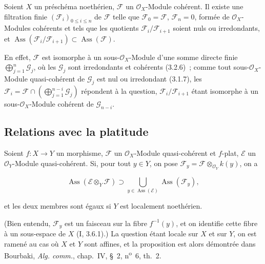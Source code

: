 \begin{corollary}[3.2.8]
\label{IV.2.3.2.8-fr}
Soient $X$ un préschéma noethérien, $\mathcal F$ un $\mathcal O_X$-Module
cohérent. Il existe une filtration finie $(\mathcal F_i)_{0\le i\le n}$ de
$\mathcal F$ telle que $\mathcal F_0=\mathcal F$, $\mathcal F_n=0$, formée de
$\mathcal O_X$-Modules cohérents et tels que les quotients
$\mathcal F_i/\mathcal F_{i+1}$ soient nuls ou irredondants, et
$\operatorname{Ass}(\mathcal F_i/\mathcal F_{i+1})
\subset\operatorname{Ass}(\mathcal F)$.
\end{corollary}

En effet, $\mathcal F$ est isomorphe à un sous-$\mathcal O_X$-Module d'une
somme directe finie $\bigoplus_{j=1}^n\mathcal G_j$, où les $\mathcal G_j$
sont irredondants et cohérents (3.2.6)~; comme tout sous-$\mathcal O_X$-Module
quasi-cohérent de $\mathcal G_j$ est nul ou irredondant (3.1.7), les
$\mathcal F_i=\mathcal F\cap(\bigoplus_{j=1}^{n-i}\mathcal G_j)$ répondent à
la question, $\mathcal F_i/\mathcal F_{i+1}$ étant isomorphe à un
sous-$\mathcal O_X$-Module cohérent de $\mathcal G_{n-i}$.

\subsection{Relations avec la platitude}

\begin{proposition}[3.3.1]
\label{IV.2.3.3.1-fr}
Soient $f:X\to Y$ un morphisme, $\mathcal F$ un $\mathcal O_X$-Module
quasi-cohérent et $f$-plat, $\mathcal E$ un $\mathcal O_Y$-Module
quasi-cohérent. Si, pour tout $y\in Y$, on pose
$\mathcal F_y=\mathcal F\otimes_{\mathcal O_Y}k(y)$, on a
\end{proposition}

\begin{env}[3.3.1.1]
\label{IV.2.3.3.1.1-fr}
\[
\operatorname{Ass}(\mathcal E\otimes_Y\mathcal F)
\supset\bigcup_{y\in\operatorname{Ass}(\mathcal E)}
\operatorname{Ass}(\mathcal F_y),
\]
\end{env}

et les deux membres sont égaux si $Y$ est localement noethérien.

(Bien entendu, $\mathcal F_y$ est un faisceau sur la fibre $f^{-1}(y)$, et on
identifie cette fibre à un sous-espace de $X$ (I, 3.6.1).) La question étant
locale sur $X$ et sur $Y$, on est ramené au cas où $X$ et $Y$ sont affines,
et la proposition est alors démontrée dans Bourbaki, \emph{Alg. comm.},
chap.~IV, \S~2, n\textsuperscript{o}~6, th.~2.

